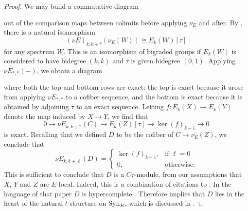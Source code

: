 \begin{proof}
	We may build a commutative diagram
	\begin{center}
	\end{center}
    out of the comparison maps between colimits before applying $\nu_E $ and after. By \cite[Remark 4.61]{Pstragowski}, there is a natural isomorphism \[(\nu E)_{k,k+*} (\nu_E(W)) \cong E_{k} (W)[\tau]\] for any spectrum $W$. This is an isomorphism of bigraded groups if $E_k (W)$ is considered to have bidegree $(k,k)$ and $\tau$ is given bidegree $(0,1)$. Applying $\nu E_{*,*} (-)$, we obtain a diagram
	\begin{center}
	\end{center}
	where both the top and bottom rows are exact: the top is exact because it arose from applying $\nu E_{*,*}$ to a cofiber sequence, and the bottom is exact because it is obtained by adjoining $\tau$ to an exact sequence.
    Letting $f : E_{k} (X) \to E_k (Y)$ denote the map induced by $X \to Y$, we find that \[ 0 \to \nu E_{k,k+*} (C) \to E_k (Z) [\tau] \to \ker(f)_{k-1} \to 0 \] is exact. Recalling that we defined $D$ to be the cofiber of $C \to \nu_E (Z)$, we conclude that \[\nu E_{k,k+\ell} (D) = \begin{cases} \ker(f)_{k-1},& \text{if } \ell = 0\\ 0,& \text{otherwise.} \end{cases}\]
        This is sufficient to conclude that $D$ is a $C\tau$-module, from our assumptions that $X$, $Y$ and $Z$ are $E$-local. Indeed, this is a combination of citations to \cite{Pstragowski}. In the language of that paper $D$ is hypercomplete \cite[Propositions 5.4 and 5.6]{Pstragowski}. Therefore \cite[Theorem 4.18]{Pstragowski} implies that $D$ lies in the heart of the natural $t$-structure on $\mathrm{Syn}_E$, which is discussed in \cite[Section 4.2]{Pstragowski}.

\end{proof}
